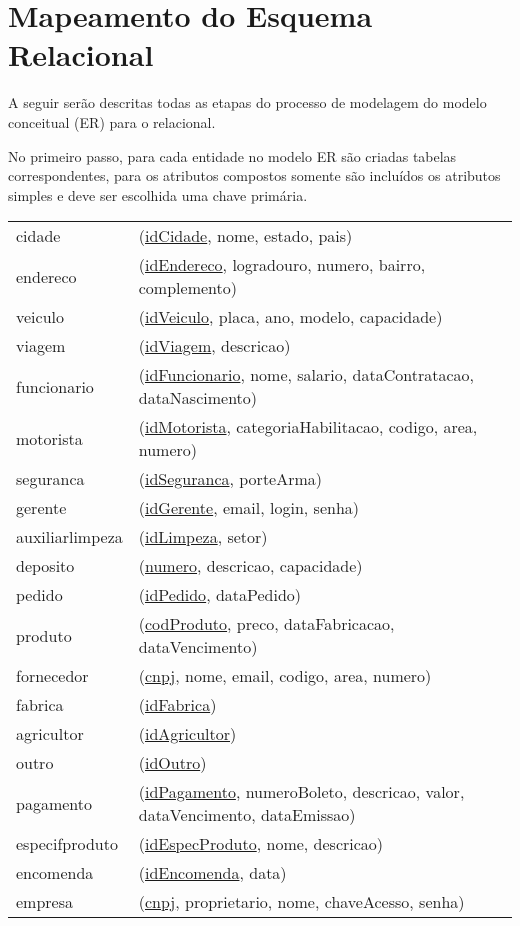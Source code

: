 \documentclass[12pt, onecolumn, titlepage]{article}
\begin{document}
\newpage
\section{Mapeamento do Esquema Relacional}
A seguir serão descritas todas as etapas do processo de modelagem do modelo conceitual (ER) para o relacional.

No primeiro passo, para cada entidade no modelo ER são criadas tabelas correspondentes, para os atributos compostos somente são incluídos os atributos simples e deve ser escolhida uma chave primária.
\\
\renewcommand{\baselinestretch}{1.2}
\begin{table}[htb!]
\begin{center}
\begin{tabular}{p{2.5cm} p{10.5cm}}
cidade & (\underline{idCidade}, nome, estado, pais) \\
endereco & (\underline{idEndereco}, logradouro, numero, bairro, complemento) \\
veiculo & (\underline{idVeiculo}, placa, ano, modelo, capacidade) \\
viagem & (\underline{idViagem}, descricao) \\
funcionario & (\underline{idFuncionario}, nome, salario, dataContratacao, dataNascimento)\\
motorista & (\underline{idMotorista}, categoriaHabilitacao, codigo, area, numero)\\
seguranca & (\underline{idSeguranca}, porteArma)\\
gerente & (\underline{idGerente}, email, login, senha)\\
auxiliarlimpeza & (\underline{idLimpeza}, setor)\\
deposito & (\underline{numero}, descricao, capacidade)\\
pedido & (\underline{idPedido}, dataPedido)\\
produto & (\underline{codProduto}, preco, dataFabricacao, dataVencimento)\\
fornecedor & (\underline{cnpj}, nome, email, codigo, area, numero)\\
fabrica & (\underline{idFabrica})\\
agricultor & (\underline{idAgricultor})\\
outro & (\underline{idOutro})\\
pagamento & (\underline{idPagamento}, numeroBoleto, descricao, valor, dataVencimento, dataEmissao)\\
especifproduto & (\underline{idEspecProduto}, nome, descricao)\\
encomenda & (\underline{idEncomenda}, data)\\
empresa & (\underline{cnpj}, proprietario, nome, chaveAcesso, senha)
\end{tabular}
\end{center}
\end{table}
\end{document}
